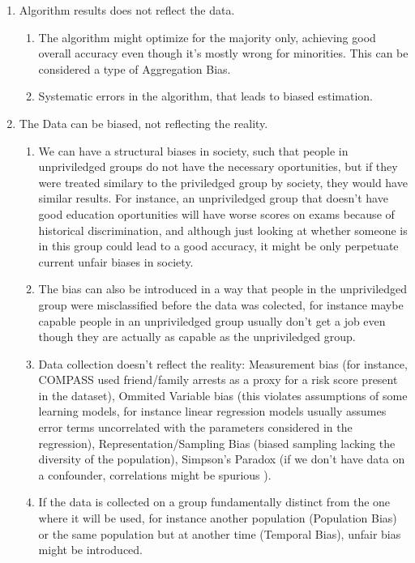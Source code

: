 \begin{enumerate}
\item Algorithm results does not reflect the data.
    \begin{enumerate}
    \item The algorithm might optimize for the majority only, achieving good overall accuracy even though it's mostly wrong for minorities. This can be considered a type of Aggregation Bias.
    \item Systematic errors in the algorithm, that leads to biased estimation.
    \end{enumerate}
\item The Data can be biased, not reflecting the reality.
    \begin{enumerate}
    \item We can have a structural biases in society, such that people in unpriviledged groups do not have the necessary oportunities, but if they were treated similary to the priviledged group by society, they would have similar results. For instance, an unpriviledged group that doesn't have good education oportunities will have worse scores on exams because of historical discrimination, and although just looking at whether someone is in this group could lead to a good accuracy, it might be only perpetuate current unfair biases in society.
    \item The bias can also be introduced in a way that people in the unpriviledged group were misclassified before the data was colected, for instance maybe capable people in an unpriviledged group usually don't get a job even though they are actually as capable as the unpriviledged group.
    \item Data collection doesn't reflect the reality: Measurement bias (for instance, COMPASS used friend/family arrests as a proxy for a risk score present in the dataset), Ommited Variable bias (this violates assumptions of some learning models, for instance linear regression models usually assumes error terms uncorrelated with the parameters considered in the regression), Representation/Sampling Bias (biased sampling lacking the diversity of the population), Simpson's Paradox (if we don't have data on a confounder, correlations might be spurious \cite{Causality}).
    \item If the data is collected on a group fundamentally distinct from the one where it will be used, for instance another population (Population Bias) or the same population but at another time (Temporal Bias), unfair bias might be introduced.

\end{enumerate}
\end{enumerate}
